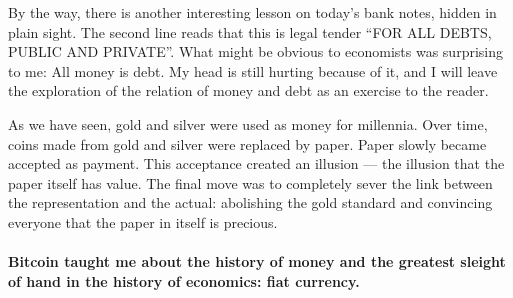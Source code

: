 By the way, there is another interesting lesson on today's bank notes,
hidden in plain sight. The second line reads that this is legal tender
\enquote{FOR ALL DEBTS, PUBLIC AND PRIVATE}. What might be obvious to economists
was surprising to me: All money is debt. My head is still hurting
because of it, and I will leave the exploration of the relation of money
and debt as an exercise to the reader.

As we have seen, gold and silver were used as money for millennia. Over
time, coins made from gold and silver were replaced by paper. Paper
slowly became accepted as payment. This acceptance created an
illusion --- the illusion that the paper itself has value. The final
move was to completely sever the link between the representation and the
actual: abolishing the gold standard and convincing everyone that the
paper in itself is precious.

\paragraph{Bitcoin taught me about the history of money and the greatest sleight of
hand in the history of economics: fiat currency.}

%
%
%
%
